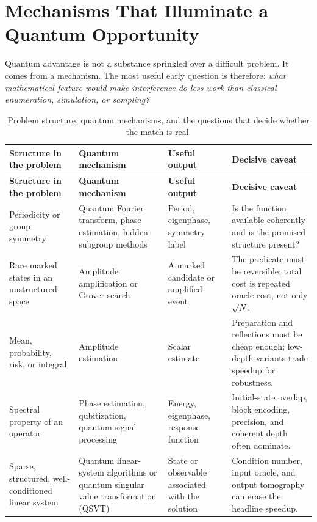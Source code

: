 \section{Mechanisms That Illuminate a Quantum Opportunity}\label{sec:mechanisms}

Quantum advantage is not a substance sprinkled over a difficult problem. It comes from a mechanism. The most useful early question is therefore: \emph{what mathematical feature would make interference do less work than classical enumeration, simulation, or sampling?}

\begin{longtable}{>{\raggedright\arraybackslash}p{} >{\raggedright\arraybackslash}p{} >{\raggedright\arraybackslash}p{} >{\raggedright\arraybackslash}p{}}
\caption{Problem structure, quantum mechanisms, and the questions that decide whether the match is real.}\label{tab:mechanisms}\\
\toprule
\textbf{Structure in the problem} & \textbf{Quantum mechanism} & \textbf{Useful output} & \textbf{Decisive caveat}\\
\midrule
\endfirsthead
\toprule
\textbf{Structure in the problem} & \textbf{Quantum mechanism} & \textbf{Useful output} & \textbf{Decisive caveat}\\
\midrule
\endhead
Periodicity or group symmetry & Quantum Fourier transform, phase estimation, hidden-subgroup methods & Period, eigenphase, symmetry label & Is the function available coherently and is the promised structure present?\\
\addlinespace
Rare marked states in an unstructured space & Amplitude amplification or Grover search & A marked candidate or amplified event & The predicate must be reversible; total cost is repeated oracle cost, not only $\sqrt{N}$.\\
\addlinespace
Mean, probability, risk, or integral & Amplitude estimation & Scalar estimate & Preparation and reflections must be cheap enough; low-depth variants trade speedup for robustness.\\
\addlinespace
Spectral property of an operator & Phase estimation, qubitization, quantum signal processing & Energy, eigenphase, response function & Initial-state overlap, block encoding, precision, and coherent depth often dominate.\\
\addlinespace
Sparse, structured, well-conditioned linear system & Quantum linear-system algorithms or quantum singular value transformation (QSVT) & State or observable associated with the solution & Condition number, input oracle, and output tomography can erase the headline speedup.\\

\end{longtable}
